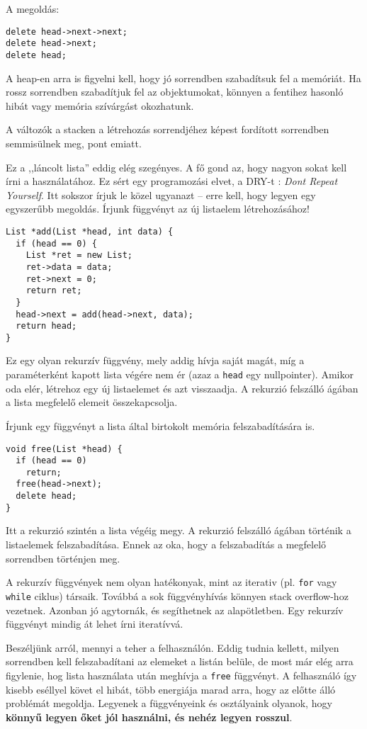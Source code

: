 \documentclass[../cpp_book/cpp_book.tex]{subfiles}
\begin{document}
	A megoldás:
	\begin{lstlisting}
delete head->next->next;
delete head->next;
delete head;
	\end{lstlisting}
	\begin{note}
		A heap-en arra is figyelni kell, hogy jó sorrendben szabadítsuk fel a memóriát. Ha rossz sorrendben szabadítjuk fel az objektumokat, könnyen a fentihez hasonló hibát vagy memória szívárgást okozhatunk.
	\end{note}
	A változók a stacken a létrehozás sorrendjéhez képest fordított sorrendben semmisülnek meg, pont emiatt.
	\medskip
	
	Ez a ,,láncolt lista'' eddig elég szegényes. A fő gond az, hogy nagyon sokat kell írni a használatához. Ez sért egy programozási elvet, a DRY-t : \textit{Dont Repeat Yourself}. Itt sokszor írjuk le közel ugyanazt -- erre kell, hogy legyen egy egyszerűbb megoldás. Írjunk függvényt az új listaelem létrehozásához!
	\begin{lstlisting}
List *add(List *head, int data) {
  if (head == 0) {
    List *ret = new List;
    ret->data = data;
    ret->next = 0;
    return ret;
  }
  head->next = add(head->next, data);
  return head;
}
	\end{lstlisting}
	Ez egy olyan rekurzív függvény, mely addig hívja saját magát, míg a paraméterként kapott lista végére nem ér (azaz a \texttt{head} egy nullpointer). Amikor oda elér, létrehoz egy új listaelemet és azt visszaadja. A rekurzió felszálló ágában a lista megfelelő elemeit összekapcsolja. 
	\medskip
	
	Írjunk egy függvényt a lista által birtokolt memória felszabadítására is.
	\begin{lstlisting}
void free(List *head) {
  if (head == 0)
    return;
  free(head->next);
  delete head;
}
	\end{lstlisting}
	Itt a rekurzió szintén a lista végéig megy. A rekurzió felszálló ágában történik a listaelemek felszabadítása. Ennek az oka, hogy a felszabadítás a megfelelő sorrendben történjen meg.
	\begin{note}
		A rekurzív függvények nem olyan hatékonyak, mint az iterativ (pl. \texttt{for} vagy \texttt{while} ciklus) társaik. Továbbá a sok függvényhívás könnyen stack overflow-hoz vezetnek. Azonban jó agytornák, és segíthetnek az alapötletben. Egy rekurzív függvényt mindig át lehet írni iteratívvá.
	\end{note}
	Beszéljünk arról, mennyi a teher a felhasználón. Eddig tudnia kellett, milyen sorrendben kell felszabadítani az elemeket a listán belüle, de most már elég arra figylenie, hog lista használata után meghívja a \texttt{free} függvényt. A felhasználó így kisebb eséllyel követ el hibát, több energiája marad arra, hogy az előtte álló problémát megoldja. Legyenek a függvényeink és osztályaink olyanok, hogy \textbf{könnyű legyen őket jól használni, és nehéz legyen rosszul}.
	
\end{document}
